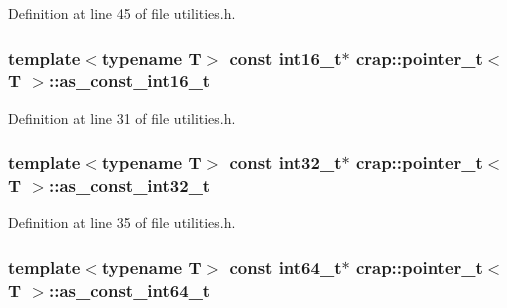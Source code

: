 Definition at line 45 of file utilities.\+h.

\hypertarget{structcrap_1_1pointer__t_ae390d11f93bef65281220f053dae1b09}{}
\subsubsection[{as\+\_\+const\+\_\+int16\+\_\+t}]{\setlength{\rightskip}{0pt plus 5cm}template$<$typename T$>$ const int16\+\_\+t$\ast$ {\bf crap\+::pointer\+\_\+t}$<$ T $>$\+::as\+\_\+const\+\_\+int16\+\_\+t}\label{structcrap_1_1pointer__t_ae390d11f93bef65281220f053dae1b09}


Definition at line 31 of file utilities.\+h.

\hypertarget{structcrap_1_1pointer__t_a9d42c28d7e4642583907174295bef068}{}
\subsubsection[{as\+\_\+const\+\_\+int32\+\_\+t}]{\setlength{\rightskip}{0pt plus 5cm}template$<$typename T$>$ const int32\+\_\+t$\ast$ {\bf crap\+::pointer\+\_\+t}$<$ T $>$\+::as\+\_\+const\+\_\+int32\+\_\+t}\label{structcrap_1_1pointer__t_a9d42c28d7e4642583907174295bef068}


Definition at line 35 of file utilities.\+h.

\hypertarget{structcrap_1_1pointer__t_aa450d0a7bc03e4a67cce1e2f4bb034eb}{}
\subsubsection[{as\+\_\+const\+\_\+int64\+\_\+t}]{\setlength{\rightskip}{0pt plus 5cm}template$<$typename T$>$ const int64\+\_\+t$\ast$ {\bf crap\+::pointer\+\_\+t}$<$ T $>$\+::as\+\_\+const\+\_\+int64\+\_\+t}\label{structcrap_1_1pointer__t_aa450d0a7bc03e4a67cce1e2f4bb034eb}


